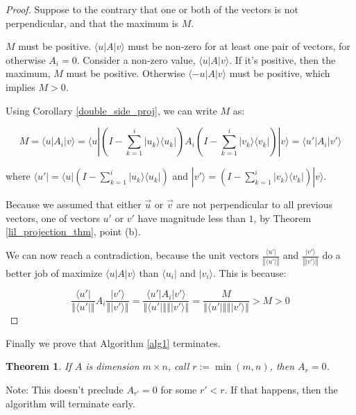 \documentclass{amsbook}
\newtheorem{theorem}{Theorem}
\begin{document}
\begin{proof}
\label{svd_perpendicular}
Suppose to the contrary that one or both of the vectors is not perpendicular, and that the maximum is $M$.

$M$ must be positive.  $\langle u|A|v\rangle$ must be non-zero for at least one pair of vectors, for otherwise $A_i=0$.  Consider a non-zero value, $\langle u|A|v\rangle$.  If it's positive, then the maximum, $M$ must be positive.  Otherwise $\langle -u|A|v\rangle$ must be positive, which implies $M>0$.

Using Corollary \ref{double_side_proj}, we can write $M$ as:

$$
M=\langle u |A_i| v \rangle=\langle u |\left(I-\sum_{k=1}^i| u _k\rangle\langle u _k|\right)A_i\left(I-\sum_{k=1}^{i}| v _k\rangle\langle v _k|\right)| v \rangle=\langle u '|A_i| v '\rangle
$$

where $\langle u'|=\langle u |\left(I-\sum_{k=1}^i| u _k\rangle\langle u _k|\right)$ and $|v'\rangle=\left(I-\sum_{k=1}^{i}| v _k\rangle\langle v _k|\right)| v \rangle$.

Because we assumed that either $\vec u$ or $\vec v$ are not perpendicular to all previous vectors, one of vectors $ u '$ or $ v '$ have magnitude less than $1$, by Theorem \ref{lil_projection_thm}, point (b).

We can now reach a contradiction, because the unit vectors $\frac{\langle u '|}{\left\Vert\langle u '|\right\Vert}$ and $\frac{| v '\rangle}{\left\Vert| v '\rangle\right\Vert}$ do a better job of maximize $\langle u|A|v\rangle$ than $\langle u_i|$ and $|v_i\rangle$.  This is because:

$$
\frac{\langle u '|}{\left\Vert\langle u '|\right\Vert}A_i\frac{| v '\rangle}{\left\Vert| v '\rangle\right\Vert} = \frac{\langle u'|A_i|v'\rangle}{\left\Vert\langle u '|\right\Vert\left\Vert| v '\rangle\right\Vert} = \frac{M}{\left\Vert\langle u '|\right\Vert\left\Vert| v '\rangle\right\Vert} > M >0
$$

\end{proof}

Finally we prove that Algorithm \ref{alg1} terminates.

 \begin{theorem}
\label{svd_terminates}
If $A$ is dimension $m\times n$, call $r:=\min(m,n)$, then $A_r=0$.
 \end{theorem}

Note:  This doesn't preclude $A_{r'}=0$ for some $r'<r$.  If that happens, then the algorithm will terminate early.
\end{document}
